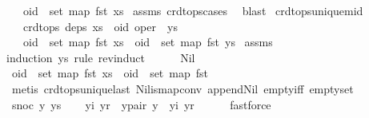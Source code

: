 \begin{isabellebody}
\ \ \ {\isachardoublequoteopen}oid\ {\isasymnotin}\ set\ {\isacharparenleft}map\ fst\ xs{\isacharparenright}{\isachardoublequoteclose}\isanewline
%
\isadelimproof
%
\endisadelimproof
%
\isatagproof
{}\isamarkupfalse%
\ assms\ crdt{\isacharunderscore}ops{\isachardot}cases\ \isamarkupfalse%
\ blast%
\endisatagproof
{\isafoldproof}%
%
\isadelimproof
\isanewline
%
\endisadelimproof
\isanewline
{}\isamarkupfalse%
\ crdt{\isacharunderscore}ops{\isacharunderscore}unique{\isacharunderscore}mid{\isacharcolon}\isanewline
\ \ \ {\isachardoublequoteopen}crdt{\isacharunderscore}ops\ deps\ {\isacharparenleft}xs\ {\isacharat}\ {\isacharbrackleft}{\isacharparenleft}oid{\isacharcomma}\ oper{\isacharparenright}{\isacharbrackright}\ {\isacharat}\ ys{\isacharparenright}{\isachardoublequoteclose}\isanewline
\ \ \ {\isachardoublequoteopen}oid\ {\isasymnotin}\ set\ {\isacharparenleft}map\ fst\ xs{\isacharparenright}\ {\isasymand}\ oid\ {\isasymnotin}\ set\ {\isacharparenleft}map\ fst\ ys{\isacharparenright}{\isachardoublequoteclose}\isanewline
%
\isadelimproof
%
\endisadelimproof
%
\isatagproof
{}\isamarkupfalse%
\ assms\ \isamarkupfalse%
{\isacharparenleft}induction\ ys\ rule{\isacharcolon}\ rev{\isacharunderscore}induct{\isacharparenright}\ \ \isanewline
\ \ \isamarkupfalse%
\ Nil\isanewline
\ \ \isamarkupfalse%
\ \isamarkupfalse%
\ {\isachardoublequoteopen}oid\ {\isasymnotin}\ set\ {\isacharparenleft}map\ fst\ xs{\isacharparenright}\ {\isasymand}\ oid\ {\isasymnotin}\ set\ {\isacharparenleft}map\ fst\ {\isacharbrackleft}{\isacharbrackright}{\isacharparenright}{\isachardoublequoteclose}\isanewline
\ \ \ \ \isamarkupfalse%
\ {\isacharparenleft}metis\ crdt{\isacharunderscore}ops{\isacharunderscore}unique{\isacharunderscore}last\ Nil{\isacharunderscore}is{\isacharunderscore}map{\isacharunderscore}conv\ append{\isacharunderscore}Nil{}\ empty{\isacharunderscore}iff\ empty{\isacharunderscore}set{\isacharparenright}\isanewline
{}\isamarkupfalse%
\isanewline
\ \ \isamarkupfalse%
\ {\isacharparenleft}snoc\ y\ ys{\isacharparenright}\isanewline
\ \ \isamarkupfalse%
\ yi\ yr\ \ y{\isacharunderscore}pair{\isacharcolon}\ {\isachardoublequoteopen}y\ {\isacharequal}\ {\isacharparenleft}yi{\isacharcomma}\ yr{\isacharparenright}{\isachardoublequoteclose}\isanewline
\ \ \ \ \isamarkupfalse%
\ fastforce\isanewline

\end{isabellebody}
